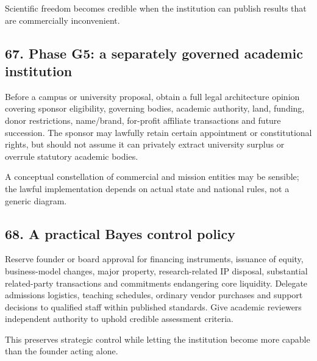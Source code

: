 Scientific freedom becomes credible when the institution can publish results that are commercially inconvenient.

\subsection{67. Phase G5: a separately governed academic institution}

Before a campus or university proposal, obtain a full legal architecture opinion covering sponsor eligibility, governing bodies, academic authority, land, funding, donor restrictions, name/brand, for-profit affiliate transactions and future succession. The sponsor may lawfully retain certain appointment or constitutional rights, but should not assume it can privately extract university surplus or overrule statutory academic bodies.

A conceptual constellation of commercial and mission entities may be sensible; the lawful implementation depends on actual state and national rules, not a generic diagram.

\subsection{68. A practical Bayes control policy}

Reserve founder or board approval for financing instruments, issuance of equity, business-model changes, major property, research-related IP disposal, substantial related-party transactions and commitments endangering core liquidity. Delegate admissions logistics, teaching schedules, ordinary vendor purchases and support decisions to qualified staff within published standards. Give academic reviewers independent authority to uphold credible assessment criteria.

This preserves strategic control while letting the institution become more capable than the founder acting alone.
